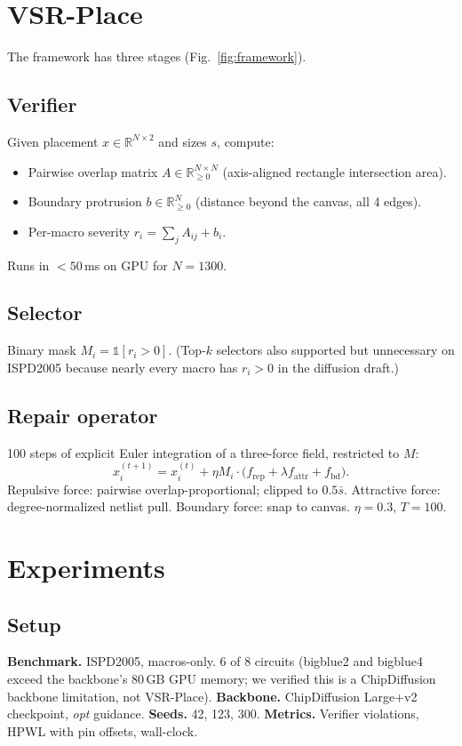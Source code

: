 \documentclass[conference]{IEEEtran}
\begin{document}
\section{VSR-Place}

The framework has three stages (Fig.~\ref{fig:framework}).

\subsection{Verifier}
Given placement $x \in \mathbb{R}^{N \times 2}$ and sizes $s$, compute:
\begin{itemize}
\item Pairwise overlap matrix $A \in \mathbb{R}^{N\times N}_{\geq 0}$ (axis-aligned rectangle intersection area).
\item Boundary protrusion $b \in \mathbb{R}^N_{\geq 0}$ (distance beyond the canvas, all 4 edges).
\item Per-macro severity $r_i = \sum_j A_{ij} + b_i$.
\end{itemize}
Runs in $<50$\,ms on GPU for $N=1300$.

\subsection{Selector}
Binary mask $M_i = \mathbb{1}[r_i > 0]$. (Top-$k$ selectors also supported but unnecessary on ISPD2005 because nearly every macro has $r_i > 0$ in the diffusion draft.)

\subsection{Repair operator}
100 steps of explicit Euler integration of a three-force field, restricted to $M$:
\begin{equation}
x_i^{(t+1)} = x_i^{(t)} + \eta M_i \cdot \big( f_{\text{rep}} + \lambda f_{\text{attr}} + f_{\text{bd}} \big).
\end{equation}
Repulsive force: pairwise overlap-proportional; clipped to $0.5\bar{s}$. Attractive force: degree-normalized netlist pull. Boundary force: snap to canvas. $\eta = 0.3$, $T = 100$.

\section{Experiments}

\subsection{Setup}
\textbf{Benchmark.} ISPD2005, macros-only. 6 of 8 circuits (bigblue2 and bigblue4 exceed the backbone's 80\,GB GPU memory; we verified this is a ChipDiffusion backbone limitation, not VSR-Place).
\textbf{Backbone.} ChipDiffusion Large+v2 checkpoint, \emph{opt} guidance.
\textbf{Seeds.} 42, 123, 300.
\textbf{Metrics.} Verifier violations, HPWL with pin offsets, wall-clock.
\end{document}
